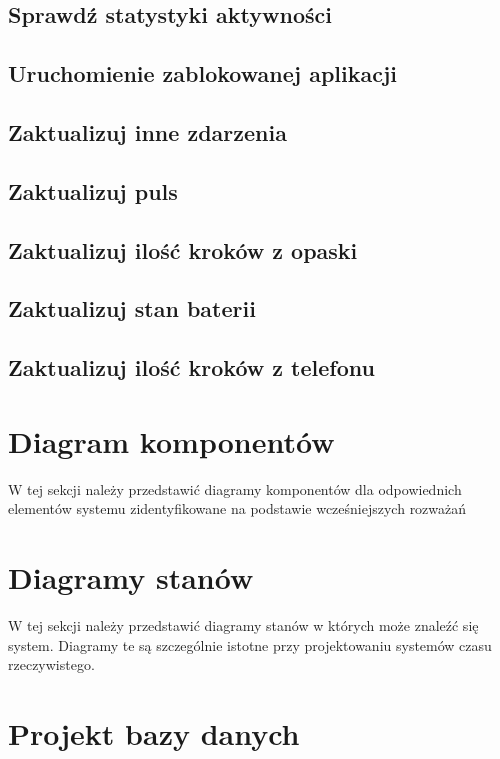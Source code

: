 \subsection{Sprawdź statystyki aktywności}

\subsection{Uruchomienie zablokowanej aplikacji}

\subsection{Zaktualizuj inne zdarzenia}

\subsection{Zaktualizuj puls}

\subsection{Zaktualizuj ilość kroków z opaski}

\subsection{Zaktualizuj stan baterii}

\subsection{Zaktualizuj ilość kroków z telefonu}

\section{Diagram komponentów}

W tej sekcji należy przedstawić diagramy komponentów dla odpowiednich elementów systemu zidentyfikowane na podstawie wcześniejszych rozważań

\section{Diagramy stanów}

W tej sekcji należy przedstawić diagramy stanów w których może znaleźć się system. Diagramy te są szczególnie istotne przy projektowaniu systemów czasu rzeczywistego.

\section{Projekt bazy danych}

